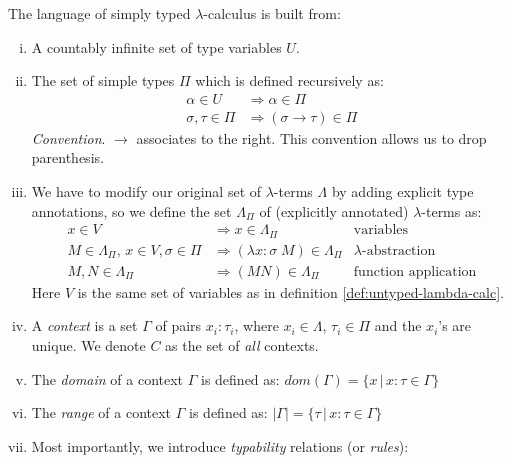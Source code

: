 \begin{definition}
The language of simply typed $\lambda$-calculus is built from:
    \begin{enumerate}[(i)]
        \item A countably infinite set of type variables $U$.
        \item The set of simple types $\Pi$ which is defined recursively as:
        \begin{align*}
            \alpha \in U &\Rightarrow \alpha \in \Pi \\
            \sigma, \tau \in \Pi &\Rightarrow (\sigma \to \tau) \in \Pi
        \end{align*}
            \emph{Convention}. $\to$ associates to the right. This convention
            allows us to drop parenthesis.
        \item We have to modify our original set of $\lambda$-terms $\Lambda$
            by adding explicit type annotations, so we define the set
            $\Lambda_\Pi$ of (explicitly annotated) $\lambda$-terms as:
                \begin{align*}
                    x \in V & \Rightarrow x \in \Lambda_\Pi &
                        \text{variables} \\
                    M \in \Lambda_\Pi,\, x \in V, \sigma \in \Pi & \Rightarrow
                    (\lambda x\!:\!\sigma\; M) \in \Lambda_\Pi &
                        \text{$\lambda$-abstraction} \\
                    M, N \in \Lambda_\Pi & \Rightarrow (M N) \in \Lambda_\Pi &
                        \text{function application}
                \end{align*}
                Here $V$ is the same set of variables as in definition
                \ref{def:untyped-lambda-calc}.
        \item A \emph{context} is a set $\Gamma$ of pairs $x_i: \tau_i$, where $x_i \in
        \Lambda$, $\tau_i \in \Pi$ and the $x_i$'s are unique. We denote $C$ as
        the set of \emph{all} contexts.
        \item The \emph{domain} of a context $\Gamma$ is defined as:
            $dom(\Gamma) = \{x\,|\, x:\tau \in \Gamma \}$
        \item The \emph{range} of a context $\Gamma$ is defined as:
            $|\Gamma| = \{ \tau \,|\, x:\tau \in \Gamma\}$
        \item Most importantly, we introduce \emph{typability} relations (or
        \emph{rules}):


\end{enumerate}
\end{definition}
